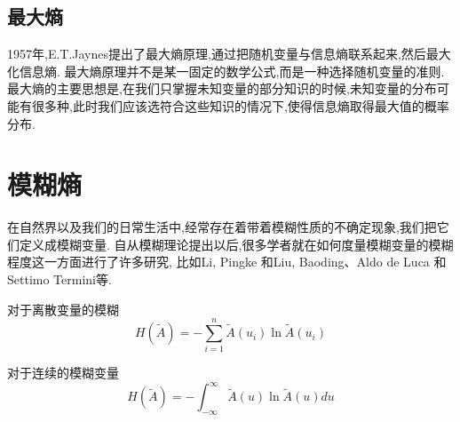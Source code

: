 \subsection{最大熵}
1957年,E.T.Jaynes提出了最大熵原理,通过把随机变量与信息熵联系起来,然后最大化信息熵.
最大熵原理并不是某一固定的数学公式,而是一种选择随机变量的准则.
最大熵的主要思想是,在我们只掌握未知变量的部分知识的时候,未知变量的分布可能有很多种,此时我们应该选符合这些知识的情况下,使得信息熵取得最大值的概率分布.

\section{模糊熵}
在自然界以及我们的日常生活中,经常存在着带着模糊性质的不确定现象,我们把它们定义成模糊变量.
自从模糊理论提出以后,很多学者就在如何度量模糊变量的模糊程度这一方面进行了许多研究,
比如Li, Pingke 和Liu, Baoding\cite{li2008entropy}、Aldo de Luca 和 Settimo Termini\cite{RN3}等.
\begin{definition}[模糊熵]
    对于离散变量的模糊
    \begin{equation}
        H(\tilde{A})=-\sum_{i=1}^{n}\tilde{A}(u_i) \ln \tilde{A}(u_i)
    \end{equation}

    对于连续的模糊变量
    \begin{equation}
        H(\tilde{A})=-\int_{-\infty}^{\infty}\tilde{A}(u) \ln \tilde{A}(u) d u
    \end{equation}

\end{definition}
